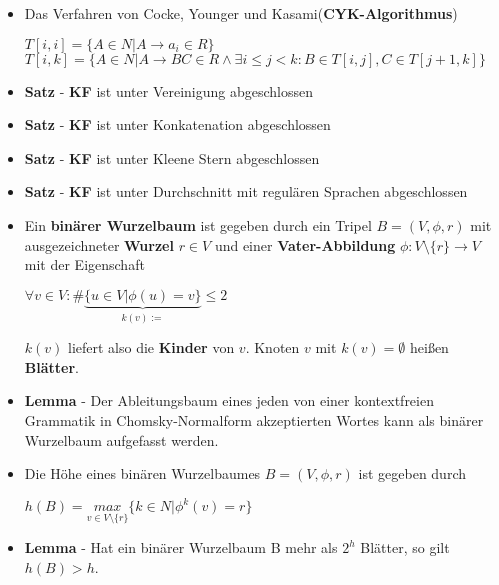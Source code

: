 \documentclass[12pt, a4paper]{article}
\begin{document}
\begin{itemize}
		\item Das Verfahren von Cocke, Younger und Kasami(\textbf{CYK-Algorithmus})
		\begin{center}
			$T[i,i]=\{A\in N|A\rightarrow a_{i}\in R \}$	\\
			$T[i,k]=\{A\in N|A\rightarrow BC\in R\wedge\exists i\leq j<k:B\in T[i,j],C\in T[j+1,k]\}$
		\end{center}
	
		\item \textbf{Satz} - \textbf{KF} ist unter Vereinigung abgeschlossen
		
		\item \textbf{Satz} - \textbf{KF} ist unter Konkatenation abgeschlossen
		
		\item \textbf{Satz} - \textbf{KF} ist unter Kleene Stern abgeschlossen
		
		\item \textbf{Satz} - \textbf{KF} ist unter Durchschnitt mit regulären Sprachen abgeschlossen
		
		\item Ein \textbf{binärer Wurzelbaum} ist gegeben durch ein Tripel $B=(V,\phi,r)$ mit ausgezeichneter \textbf{Wurzel} $r\in V$ und einer \textbf{Vater-Abbildung} $\phi:V\setminus\{r\}\rightarrow V$ mit der
		Eigenschaft 
		\begin{center}
			$\forall v\in V:\#\underset{k(v):=}{\underbrace{\{u\in V|\phi(u)=v\}}}\leq2$
		\end{center}
			\subitem $k(v)$ liefert also die \textbf{Kinder} von $v$.
			\subitem Knoten $v$ mit $k(v)=\emptyset$ heißen \textbf{Blätter}.
		
		\item \textbf{Lemma} - Der Ableitungsbaum eines jeden von einer kontextfreien Grammatik in Chomsky-Normalform akzeptierten Wortes kann als binärer Wurzelbaum aufgefasst werden.
		
		\item Die Höhe eines binären Wurzelbaumes $B=(V,\phi,r)$ ist gegeben durch
		\begin{center}
			$h(B) = \underset{v\in V\setminus\{r\}}{max}\{k\in N|\phi^{k}(v)=r\}$
		\end{center}
			
		\item \textbf{Lemma} - Hat ein binärer Wurzelbaum B mehr als $2^{h}$ Blätter, so gilt $h(B)>h$.
		

\end{itemize}
\end{document}
